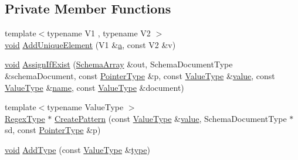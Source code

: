 \subsection*{Private Member Functions}
\begin{DoxyCompactItemize}
\item 
{\footnotesize template$<$typename V1 , typename V2 $>$ }\\\hyperlink{imgui__impl__opengl3__loader_8h_ac668e7cffd9e2e9cfee428b9b2f34fa7}{void} \hyperlink{classinternal_1_1Schema_a948f4dbe9b9b70ba6b6e33abeb4b1e4f}{Add\+Unique\+Element} (V1 \&\hyperlink{pointer_8h_aeeddce917cf130d62c370b8f216026dd}{a}, const V2 \&v)
\item 
\hyperlink{imgui__impl__opengl3__loader_8h_ac668e7cffd9e2e9cfee428b9b2f34fa7}{void} \hyperlink{classinternal_1_1Schema_aee68581c6e47937e50766af1e7ed29be}{Assign\+If\+Exist} (\hyperlink{structinternal_1_1Schema_1_1SchemaArray}{Schema\+Array} \&out, Schema\+Document\+Type \&schema\+Document, const \hyperlink{classinternal_1_1Schema_a13d7dbba6e4a77b10862546777c5aae8}{Pointer\+Type} \&p, const \hyperlink{classinternal_1_1Schema_a8976b6d7e2a885483d0b51d941019340}{Value\+Type} \&\hyperlink{imgui__impl__opengl3__loader_8h_a32aff7c6c4cd253fdf6563677afab5ce}{value}, const \hyperlink{classinternal_1_1Schema_a8976b6d7e2a885483d0b51d941019340}{Value\+Type} \&\hyperlink{imgui__impl__opengl3__loader_8h_a5c4947d4516dd7cfa3505ce3a648a4ef}{name}, const \hyperlink{classinternal_1_1Schema_a8976b6d7e2a885483d0b51d941019340}{Value\+Type} \&document)
\item 
{\footnotesize template$<$typename Value\+Type $>$ }\\\hyperlink{classinternal_1_1Schema_a78fd42fda3cecdad0ee56559b4e3cec6}{Regex\+Type} $\ast$ \hyperlink{classinternal_1_1Schema_ab117799d1d57ccc4a2c3630e9b6b873a}{Create\+Pattern} (const \hyperlink{classinternal_1_1Schema_a8976b6d7e2a885483d0b51d941019340}{Value\+Type} \&\hyperlink{imgui__impl__opengl3__loader_8h_a32aff7c6c4cd253fdf6563677afab5ce}{value}, Schema\+Document\+Type $\ast$sd, const \hyperlink{classinternal_1_1Schema_a13d7dbba6e4a77b10862546777c5aae8}{Pointer\+Type} \&p)
\item 
\hyperlink{imgui__impl__opengl3__loader_8h_ac668e7cffd9e2e9cfee428b9b2f34fa7}{void} \hyperlink{classinternal_1_1Schema_a472b5cecb9cddc7b4ef0dcdedeb005ba}{Add\+Type} (const \hyperlink{classinternal_1_1Schema_a8976b6d7e2a885483d0b51d941019340}{Value\+Type} \&\hyperlink{imgui__impl__opengl3__loader_8h_a63267399cd2a2ee217572c11d2e54f07}{type})
\item 

\end{DoxyCompactItemize}
